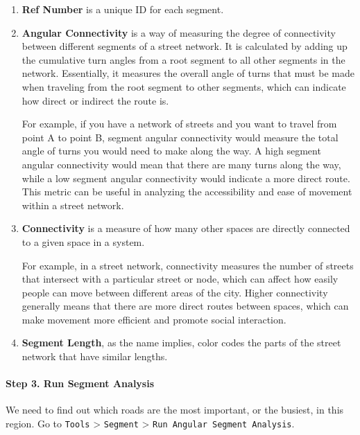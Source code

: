 \documentclass[
]{latex/krantz}
\begin{document}
\begin{enumerate}
\def\labelenumi{\arabic{enumi}.}
\item
  \textbf{Ref Number} is a unique ID for each segment.
\item
  \textbf{Angular Connectivity} is a way of measuring the degree of connectivity between different segments of a street network. It is calculated by adding up the cumulative turn angles from a root segment to all other segments in the network. Essentially, it measures the overall angle of turns that must be made when traveling from the root segment to other segments, which can indicate how direct or indirect the route is.

  For example, if you have a network of streets and you want to travel from point A to point B, segment angular connectivity would measure the total angle of turns you would need to make along the way. A high segment angular connectivity would mean that there are many turns along the way, while a low segment angular connectivity would indicate a more direct route. This metric can be useful in analyzing the accessibility and ease of movement within a street network.
\item
  \textbf{Connectivity} is a measure of how many other spaces are directly connected to a given space in a system.

  For example, in a street network, connectivity measures the number of streets that intersect with a particular street or node, which can affect how easily people can move between different areas of the city. Higher connectivity generally means that there are more direct routes between spaces, which can make movement more efficient and promote social interaction.
\item
  \textbf{Segment Length}, as the name implies, color codes the parts of the street network that have similar lengths.
\end{enumerate}

\hypertarget{step-3.-run-segment-analysis}{%
\paragraph*{Step 3. Run Segment Analysis}\label{step-3.-run-segment-analysis}}

We need to find out which roads are the most important, or the busiest, in this region. Go to \texttt{Tools} \textgreater{} \texttt{Segment} \textgreater{} \texttt{Run\ Angular\ Segment\ Analysis}.
\end{document}
